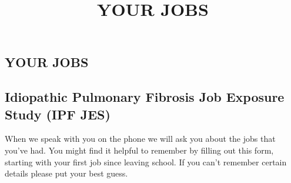 \documentclass[a4paper,10pt]{article}
\begin{document}
 \newpage\title{\bf YOUR JOBS}
 \date{}
 
 
 \pagestyle{fancy}
 
 
 \begin{centering} 
     \section*{YOUR JOBS}
 \end{centering}

 \subsection*{Idiopathic Pulmonary Fibrosis Job Exposure Study (IPF JES)}

 When we speak with you on the phone we will ask you about the jobs that you've had. You might find it helpful to remember by filling out this form, starting with your first job since leaving school.  If you can’t remember certain details please put your best guess.
\end{document}
